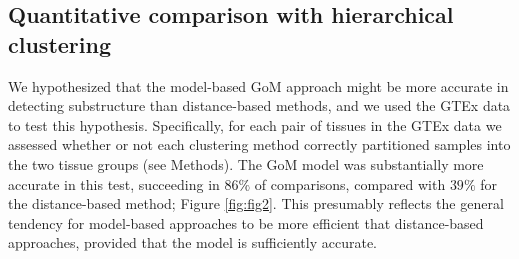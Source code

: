 




\subsection{Quantitative comparison with hierarchical clustering}

We hypothesized that the model-based GoM approach might be more accurate in detecting substructure than distance-based methods, 
and we used the GTEx data to test this hypothesis. Specifically, for each pair of tissues in the GTEx data we assessed whether or not each clustering method
correctly partitioned samples into the two tissue groups (see Methods). The GoM model was substantially more accurate in this test, succeeding
in $86 \%$ of comparisons, compared with $39 \%$ for the distance-based method; Figure \ref{fig:fig2}. This presumably reflects the general tendency for model-based
approaches to be more efficient that distance-based approaches, provided that the model is sufficiently accurate.


